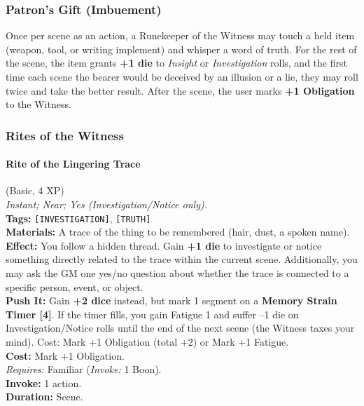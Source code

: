 \subsubsection*{Patron's Gift (Imbuement)}

Once per scene as an action, a Runekeeper of the Witness may touch a held item (weapon, tool, or writing implement) and whisper a word of truth. For the rest of the scene, the item grants \textbf{+1 die} to \textit{Insight} or \textit{Investigation} rolls, and the first time each scene the bearer would be deceived by an illusion or a lie, they may roll twice and take the better result. After the scene, the user marks \textbf{+1 Obligation} to the Witness.

\subsubsection*{Rites of the Witness}

\paragraph{Rite of the Lingering Trace} (Basic, 4 XP) \hfill \\
\emph{Instant; Near; Yes (Investigation/Notice only).} \\
\textbf{Tags:} \texttt{[INVESTIGATION]}, \texttt{[TRUTH]} \\
\textbf{Materials:} A trace of the thing to be remembered (hair, dust, a spoken name). \\
\textbf{Effect:} You follow a hidden thread. Gain \textbf{+1 die} to investigate or notice something directly related to the trace within the current scene. Additionally, you may ask the GM one yes/no question about whether the trace is connected to a specific person, event, or object. \\
\textbf{Push It:} Gain \textbf{+2 dice} instead, but mark 1 segment on a \textbf{Memory Strain Timer [4]}. If the timer fills, you gain Fatigue 1 and suffer --1 die on Investigation/Notice rolls until the end of the next scene (the Witness taxes your mind). Cost: Mark +1 Obligation (total +2) or Mark +1 Fatigue. \\
\textbf{Cost:} Mark +1 Obligation. \\
\textit{Requires:} Familiar (\textit{Invoke:} 1 Boon). \\
\textbf{Invoke:} 1 action. \\
\textbf{Duration:} Scene.

